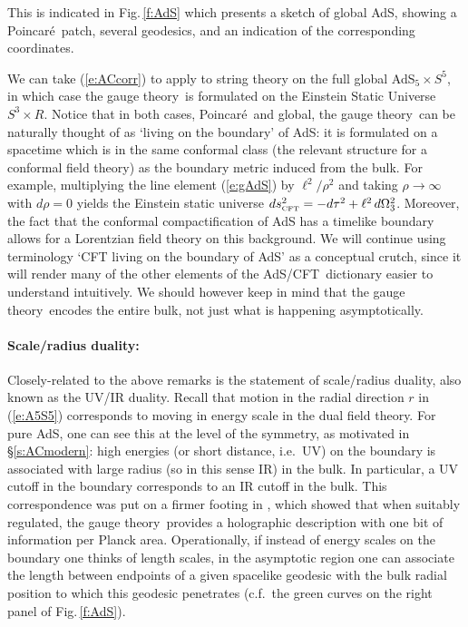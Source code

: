 \documentclass[12pt,a4paper]{article}
\def\sect#1{\S\ref{#1}}
\def\fig#1{Fig.\,\ref{#1}}
\def\req#1{(\ref{#1})}
\def\AC{AdS/CFT}
\def\GT{gauge theory}
\def\Poinc{Poincar\' e}
\def\adss#1#2{AdS$_{#1} \times S^{#2}$}
\def\Rads{\ell}
\begin{document}
%
This is indicated in \fig{f:AdS} which presents a sketch of global AdS, showing a \Poinc\ patch, several geodesics, and an indication of the corresponding coordinates.

We can take \req{e:ACcorr} to apply to string theory on the full global \adss55, in which case the \GT\ is formulated on the Einstein Static Universe $S^3 \times R$.
Notice that in both cases, \Poinc\ and global, the \GT\ can be naturally thought of as `living on the boundary' of AdS:  it is formulated on a spacetime which is in the same conformal class (the relevant structure for a conformal field theory) as the boundary metric induced from the bulk.  For example, multiplying the line element \req{e:gAdS} by $\Rads^2 / \rho^2$ and taking $\rho \to \infty$ with $d\rho = 0$ yields the Einstein static universe $ds_{\scriptscriptstyle {\rm CFT}}^2 = - d\tau^2 + \Rads^2 \, d\Omega_3^2$.
Moreover, the fact that the conformal compactification of AdS has a timelike boundary allows for a Lorentzian field theory on this background.
We will continue using  terminology  `CFT living on the boundary of AdS' as a conceptual crutch, since it will render many of the other elements of the \AC\ dictionary easier to understand intuitively.  We should however keep in mind that the \GT\ encodes the entire bulk, not just what is happening asymptotically.


\paragraph{Scale/radius duality:}  %
Closely-related to the above remarks is the statement of scale/radius duality, also known as the UV/IR duality.  
Recall that motion in the radial direction $r$  in \req{e:A5S5} corresponds to moving in energy scale in the dual field theory.  For pure AdS, one can see this at the level of the symmetry, as motivated in \sect{s:ACmodern}: high energies (or short distance, i.e.\ UV) on the boundary is associated with large radius (so in this sense IR) in the bulk. In particular, a UV cutoff in the boundary corresponds to an IR cutoff in the bulk.  
This correspondence was put on a firmer footing in \cite{Susskind:1998dq}, which showed that when suitably regulated, the \GT\ provides a  holographic description with one bit of information per Planck area.
Operationally, if instead of energy scales on the boundary one thinks of length scales, in the asymptotic region one can associate the length between endpoints of a given spacelike geodesic with the bulk radial position to which this geodesic penetrates (c.f.\ the green curves on the right panel of \fig{f:AdS}).
\end{document}
